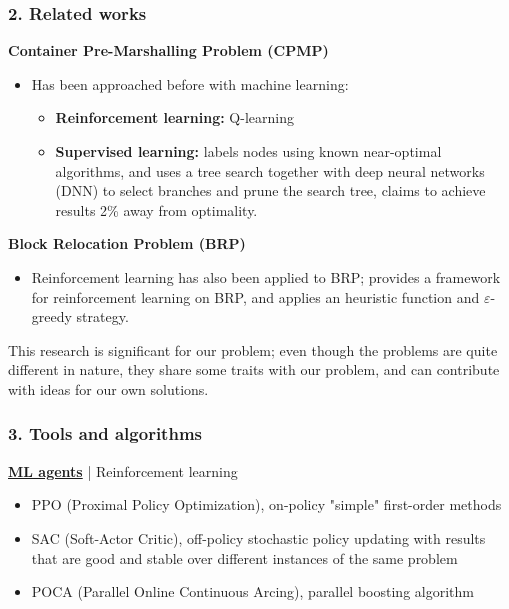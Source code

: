 \documentclass{beamer}
\begin{document}
\begin{frame}

\frametitle{2. Related works}
\textbf{Container Pre-Marshalling Problem (CPMP)}

\begin{itemize}
  \item Has been approached before with machine learning:
  \begin{itemize}
    \item \textbf{Reinforcement learning:} Q-learning \cite{hirashima2008}
    \item \textbf{Supervised learning:} \cite{hottung2020} labels nodes using known near-optimal algorithms, and uses a tree search together with deep neural networks (DNN) to select branches and prune the search tree, claims to achieve results 2\% away from optimality.
  \end{itemize}

\end{itemize}

\textbf{Block Relocation Problem (BRP)}

\begin{itemize}
  \item Reinforcement learning has also been applied to BRP; \cite{jiang2021} provides a framework for reinforcement learning on BRP, and applies an heuristic function and $\varepsilon$-greedy strategy.
\end{itemize}

This research is significant for our problem; even though the problems are quite different in nature, they share some traits with our problem, and can contribute with ideas for our own solutions.

\end{frame}

\begin{frame}
  \frametitle{3. Tools and algorithms}

  \href{https://github.com/Unity-Technologies/ml-agents}{\textbf{ML agents}} | Reinforcement learning
  \begin{itemize}
    \item PPO (Proximal Policy Optimization), on-policy "simple" first-order methods \cite{openai-ppo, schulman2017}
    \item SAC (Soft-Actor Critic), off-policy stochastic policy updating with results that are good and stable over different instances of the same problem \cite{openai-sac, haarnoja2018}
    \item POCA (Parallel Online Continuous Arcing), parallel boosting algorithm \cite{reichler2004}
  \end{itemize}
\end{frame}
\end{document}
